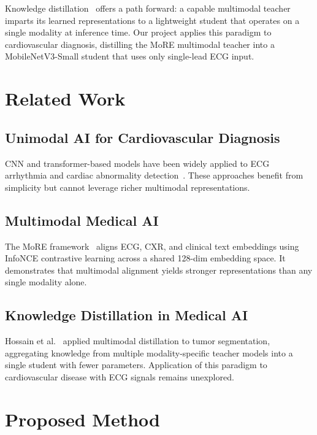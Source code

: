 \documentclass[sigconf,nonacm]{acmart}
\begin{document}
Knowledge distillation~\cite{hinton2015distilling} offers a path forward:
a capable multimodal teacher imparts its learned representations to a
lightweight student that operates on a single modality at inference time.
Our project applies this paradigm to cardiovascular diagnosis, distilling
the MoRE multimodal teacher into a MobileNetV3-Small student that uses
only single-lead ECG input.

\section{Related Work}

\subsection{Unimodal AI for Cardiovascular Diagnosis}
CNN and transformer-based models have been widely applied to ECG
arrhythmia and cardiac abnormality detection~\cite{avanzato2020,noor2025}.
These approaches benefit from simplicity but cannot leverage richer
multimodal representations.

\subsection{Multimodal Medical AI}
The MoRE framework~\cite{thapa2024more} aligns ECG, CXR, and clinical text
embeddings using InfoNCE contrastive learning across a shared 128-dim
embedding space. It demonstrates that multimodal alignment yields stronger
representations than any single modality alone.

\subsection{Knowledge Distillation in Medical AI}
Hossain et al.~\cite{hossain2025} applied multimodal distillation to tumor
segmentation, aggregating knowledge from multiple modality-specific teacher
models into a single student with fewer parameters. Application of this
paradigm to cardiovascular disease with ECG signals remains unexplored.

\section{Proposed Method}
\end{document}
